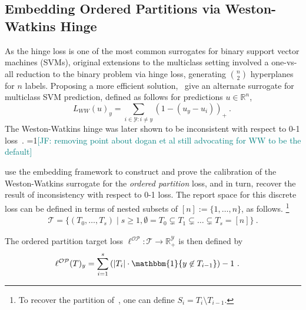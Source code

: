 \documentclass[11pt]{article}
\newcommand{\Comments}{1}
\newcommand{\mynote}[2]{\ifnum\Comments=1\textcolor{#1}{#2}\fi}
\newcommand{\raf}[1]{\mynote{darkgreen}{[RF: #1]}}
\newcommand{\jessie}[1]{\mynote{teal}{[JF: #1]}}
\newcommand{\reals}{\mathbb{R}}
\newcommand{\OP}{\mathcal{OP}}
\newcommand{\T}{\mathcal{T}}
\newcommand{\Y}{\mathcal{Y}}
\newcommand{\ones}{\mathbbm{1}}
\newcommand{\Ind}[1]{\ones\{#1\}}
\begin{document}
\subsection{Embedding Ordered Partitions via Weston-Watkins Hinge}
\label{sec:winge}
As the hinge loss is one of the most common surrogates for binary support vector machines (SVMs), original extensions to the multiclass setting involved a one-vs-all reduction to the binary problem via hinge loss, generating ${n \choose 2}$ hyperplanes for $n$ labels.
Proposing a more efficient solution,~\citet{weston1999support} give an alternate surrogate for multiclass SVM prediction, defined as follows for predictions $u \in \reals^n$,
\begin{equation}\label{eq:ww-hinge}
L_{WW}(u)_y = \sum_{i \in \Y : i \neq y} (1 - (u_y - u_i))_+~.~
\end{equation}
The Weston-Watkins hinge was later shown to be inconsistent with respect to 0-1 loss~\citep{tewari2007consistency,liu2007fisher}. %
\jessie{removing point about dogan et al still advocating for WW to be the default}

\citet*{wang2020weston} use the embedding framework to construct and prove the calibration of the Weston-Watkins surrogate for the \emph{ordered partition} loss, and in turn, recover the result of inconsistency with respect to 0-1 loss.
The report space for this discrete loss can be defined in terms of nested subsets of $[n] := \{1, \ldots, n\}$, as follows.%
\footnote{To recover the partition of~\citet{wang2020weston}, one can define $S_i = T_i \setminus T_{i-1}$.}
\begin{align*}
\T = \{ (T_0,\ldots,T_s) \mid s \geq 1, \emptyset = T_0 \subsetneq T_1 \subsetneq \ldots \subsetneq T_s = [n]\}~.
\end{align*}


The ordered partition target loss $\ell^{\OP} : \T \to \reals^\Y_+$ is then defined by
\begin{align*}
\ell^\OP(T)_y &= \sum_{i=1}^{s} \left(|T_{i}| \cdot \Ind{y \not \in T_{i-1}} \right) -1~.~
\end{align*}
\end{document}
